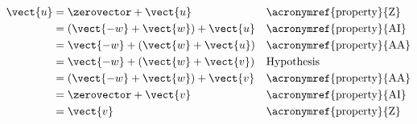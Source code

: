 %
\begin{align*}
\vect{u}
&=\zerovector+\vect{u}&&\text{\acronymref{property}{Z}}\\
&=\left(\vect{-w}+\vect{w}\right)+\vect{u}&&\text{\acronymref{property}{AI}}\\
&=\vect{-w}+\left(\vect{w}+\vect{u}\right)&&\text{\acronymref{property}{AA}}\\
&=\vect{-w}+\left(\vect{w}+\vect{v}\right)&&\text{Hypothesis}\\
&=\left(\vect{-w}+\vect{w}\right)+\vect{v}&&\text{\acronymref{property}{AA}}\\
&=\zerovector+\vect{v}&&\text{\acronymref{property}{AI}}\\
&=\vect{v}&&\text{\acronymref{property}{Z}}
%
\end{align*}
